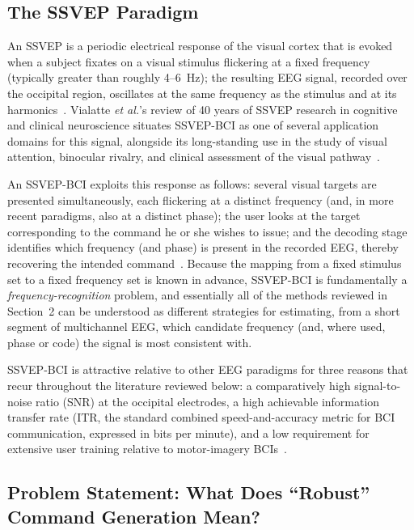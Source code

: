 \documentclass[11pt]{article}
\begin{document}
\subsection{The SSVEP Paradigm}

An SSVEP is a periodic electrical response of the visual cortex that is evoked when a subject fixates on a visual stimulus flickering at a fixed frequency (typically greater than roughly 4--6~Hz); the resulting EEG signal, recorded over the occipital region, oscillates at the same frequency as the stimulus and at its harmonics~\cite{vialatte2010ssvep}. Vialatte \textit{et al.}'s review of 40 years of SSVEP research in cognitive and clinical neuroscience situates SSVEP-BCI as one of several application domains for this signal, alongside its long-standing use in the study of visual attention, binocular rivalry, and clinical assessment of the visual pathway~\cite{vialatte2010ssvep}.

An SSVEP-BCI exploits this response as follows: several visual targets are presented simultaneously, each flickering at a distinct frequency (and, in more recent paradigms, also at a distinct phase); the user looks at the target corresponding to the command he or she wishes to issue; and the decoding stage identifies which frequency (and phase) is present in the recorded EEG, thereby recovering the intended command~\cite{lin2007cca}. Because the mapping from a fixed stimulus set to a fixed frequency set is known in advance, SSVEP-BCI is fundamentally a \emph{frequency-recognition} problem, and essentially all of the methods reviewed in Section~2 can be understood as different strategies for estimating, from a short segment of multichannel EEG, which candidate frequency (and, where used, phase or code) the signal is most consistent with.

SSVEP-BCI is attractive relative to other EEG paradigms for three reasons that recur throughout the literature reviewed below: a comparatively high signal-to-noise ratio (SNR) at the occipital electrodes, a high achievable information transfer rate (ITR, the standard combined speed-and-accuracy metric for BCI communication, expressed in bits per minute), and a low requirement for extensive user training relative to motor-imagery BCIs~\cite{li2024sutl}.

\subsection{Problem Statement: What Does ``Robust'' Command Generation Mean?}
\end{document}
